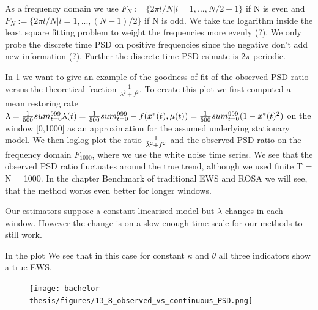 \documentclass[%
thesis=student,%
coverpage=false,%
titlepage=false,%
headmarks=true, %
german,%
font=libertine, %
math=newpxtx, %
BCOR=5mm,%
coverBCOR=11mm%
]{tumbook}
\begin{document}
As a frequency domain we use $F_{N}:=\{2\pi l/N | l = 1,...,N/2 - 1\}$ if N is even and $F_{N} := \{2\pi l/N | l = 1,...,(N-1)/2 \}$ if N is odd. We take the logarithm inside the least square fitting problem to weight the frequencies more evenly (?). We only probe the discrete time PSD on positive frequencies since the negative don't add new information (?). Further the discrete time PSD esimate is $2\pi$ periodic.

In \ref{observed_vs_continuous_PSD} we want to give an example of the goodness of fit of the observed PSD ratio versus the theoretical fraction $\frac{1}{\lambda^2 + f^2}$. To create this plot we first computed a mean restoring rate $\Bar{\lambda} = \frac{1}{500}sum_{t=0}^{999}\lambda(t) = \frac{1}{500}sum_{t=0}^{999}-f(x^{*}(t),\mu(t)) = \frac{1}{500}sum_{t=0}^{999}(1-x^{*}(t)^2)$ on the window [0,1000] as an approximation for the assumed underlying stationary model. We then loglog-plot the ratio $\frac{1}{\Bar{\lambda}^2 + f^2}$ and the observed PSD ratio on the frequency domain $F_{1000}$, where we use the white noise time series. We see that the observed PSD ratio fluctuates around the true trend, although we used finite T = N = 1000.
In the chapter Benchmark of traditional EWS and ROSA we will see, that the method works even better for longer windows.


Our estimators suppose a constant linearised model but $\lambda$ changes in each window. However the change is on a slow enough time scale for our methods to still work.

In the plot We see that in this case for constant $\kappa$ and $\theta$ all three indicators show a true EWS.


\begin{figure}
    \centering
    \texttt{[image: bachelor-thesis/figures/13\_8\_observed\_vs\_continuous\_PSD.png]}
    \label{observed_vs_continuous_PSD}
\end{figure}
\end{document}
